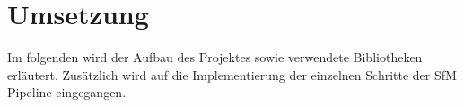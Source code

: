 \chapter{Umsetzung}\label{sec:implementation}
Im folgenden wird der Aufbau des Projektes sowie verwendete Bibliotheken erläutert.
Zusätzlich wird auf die Implementierung der einzelnen Schritte der SfM Pipeline eingegangen.








